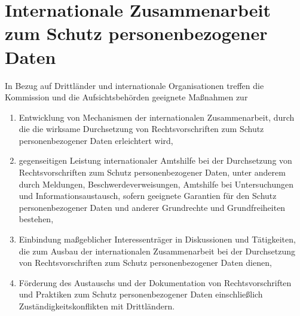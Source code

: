 \chapter{Internationale Zusammenarbeit zum Schutz personenbezogener Daten}
\label{ch:50}


In Bezug auf Drittländer und internationale Organisationen treffen die Kommission und die Aufsichtsbehörden geeignete
Maßnahmen zur

\begin{enumerate}[label=\alph*)]
  
  \item Entwicklung von Mechanismen der internationalen Zusammenarbeit, durch die die wirksame Durchsetzung von
   Rechtsvorschriften zum Schutz personenbezogener Daten erleichtert wird,
  \label{itm:50-a}

  \item gegenseitigen Leistung internationaler Amtshilfe bei der Durchsetzung von Rechtsvorschriften zum Schutz
   personenbezogener Daten, unter anderem durch Meldungen, Beschwerdeverweisungen, Amtshilfe bei Untersuchungen und
   Informationsaustausch, sofern geeignete Garantien für den Schutz personenbezogener Daten und anderer Grundrechte und
   Grundfreiheiten bestehen,
  \label{itm:50-b}

  \item Einbindung maßgeblicher Interessenträger in Diskussionen und Tätigkeiten, die zum Ausbau der internationalen
   Zusammenarbeit bei der Durchsetzung von Rechtsvorschriften zum Schutz personenbezogener Daten dienen,
  \label{itm:50-c}

  \item Förderung des Austauschs und der Dokumentation von Rechtsvorschriften und Praktiken zum Schutz personenbezogener
   Daten einschließlich Zuständigkeitskonflikten mit Drittländern.
  \label{itm:50-d}

\end{enumerate}


